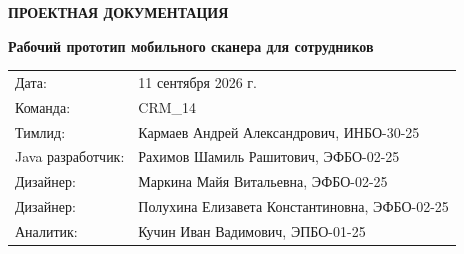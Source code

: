 \documentclass[12pt,a4paper]{article}
\begin{document}
\begin{titlepage}
  \pagecolor{LetyTechBlue}
  \color{white}
  \thispagestyle{empty}
  \vspace*{16mm}
  {\fontsize{21}{24}\selectfont\bfseries ПРОЕКТНАЯ ДОКУМЕНТАЦИЯ\par}
  \vspace{4mm}
  \vfill
  {\raggedright\fontsize{30}{36}\selectfont\bfseries Рабочий прототип мобильного сканера для сотрудников\par}
  \vspace{7mm}

  \vfill
  \begin{tabular}{@{}ll@{}}
    Дата: & 11 сентября 2026 г. \\
    Команда: & CRM\_14 \\
    Тимлид: & Кармаев Андрей Александрович, ИНБО-30-25 \\
    Java разработчик: & Рахимов Шамиль Рашитович, ЭФБО-02-25 \\
    Дизайнер: & Маркина Майя Витальевна, ЭФБО-02-25 \\
    Дизайнер: & Полухина Елизавета Константиновна, ЭФБО-02-25 \\
    Аналитик: & Кучин Иван Вадимович, ЭПБО-01-25 \\
  \end{tabular}
  \vfill
  \vspace*{10mm}
\end{titlepage}
\nopagecolor
\color{black}

\tableofcontents
\clearpage








\end{document}
